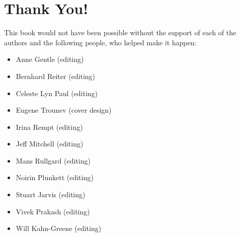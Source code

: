 \section*{Thank You!}

This book would not have been possible without the support of each of the
authors and the following people, who helped make it happen:
\begin{itemize}
 \item Anne Gentle (editing)
 \item Bernhard Reiter (editing)
 \item Celeste Lyn Paul (editing)
 \item Eugene Trounev (cover design)
 \item Irina Rempt (editing)
 \item Jeff Mitchell (editing)
 \item Mans Rullgard (editing)
 \item Noirin Plunkett (editing)
 \item Stuart Jarvis (editing)
 \item Vivek Prakash (editing)
 \item Will Kahn-Greene (editing)
\end{itemize}

\newpage